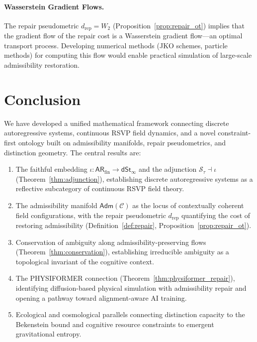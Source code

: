 \documentclass[a4paper,12pt]{article}
\theoremstyle{definition}
\newcommand{\ARfin}{\mathsf{AR}_{\mathrm{fin}}}
\newcommand{\dSt}{\mathsf{dSt}_\infty}
\newcommand{\Stau}{\mathcal{S}_\tau}
\newcommand{\iotaf}{\iota}
\newcommand{\Wtwo}{W_2}
\newcommand{\Adm}{\mathsf{Adm}}
\newcommand{\dRP}{d_{\mathrm{rep}}}
\begin{document}
\paragraph{Wasserstein Gradient Flows.} The repair pseudometric $\dRP = \Wtwo$ (Proposition~\ref{prop:repair_ot}) implies that the gradient flow of the repair cost is a Wasserstein gradient flow—an optimal transport process. Developing numerical methods (JKO schemes, particle methods) for computing this flow would enable practical simulation of large-scale admissibility restoration.

\section{Conclusion}
\label{sec:conclusion}

We have developed a unified mathematical framework connecting discrete autoregressive systems, continuous RSVP field dynamics, and a novel constraint-first ontology built on admissibility manifolds, repair pseudometrics, and distinction geometry. The central results are:

\begin{enumerate}
    \item The faithful embedding $\iotaf: \ARfin \to \dSt$ and the adjunction $\Stau \dashv \iotaf$ (Theorem~\ref{thm:adjunction}), establishing discrete autoregressive systems as a reflective subcategory of continuous RSVP field theory.
    \item The admissibility manifold $\Adm(\mathcal{C})$ as the locus of contextually coherent field configurations, with the repair pseudometric $\dRP$ quantifying the cost of restoring admissibility (Definition~\ref{def:repair}, Proposition~\ref{prop:repair_ot}).
    \item Conservation of ambiguity along admissibility-preserving flows (Theorem~\ref{thm:conservation}), establishing irreducible ambiguity as a topological invariant of the cognitive context.
    \item The PHYSIFORMER connection (Theorem~\ref{thm:physiformer_repair}), identifying diffusion-based physical simulation with admissibility repair and opening a pathway toward alignment-aware AI training.
    \item Ecological and cosmological parallels connecting distinction capacity to the Bekenstein bound and cognitive resource constraints to emergent gravitational entropy.
\end{enumerate}
\end{document}

